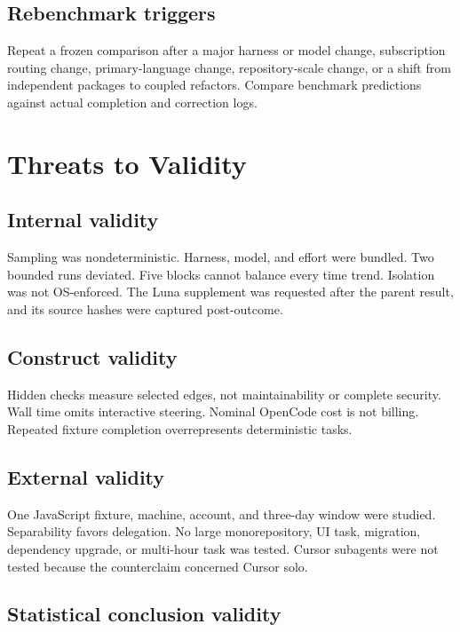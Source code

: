 \documentclass[11pt,oneside]{article}
\begin{document}
\subsection{Rebenchmark triggers}

Repeat a frozen comparison after a major harness or model change, subscription
routing change, primary-language change, repository-scale change, or a shift
from independent packages to coupled refactors. Compare benchmark predictions
against actual completion and correction logs.

\section{Threats to Validity}

\subsection{Internal validity}

Sampling was nondeterministic. Harness, model, and effort were bundled. Two
bounded runs deviated. Five blocks cannot balance every time trend. Isolation
was not OS-enforced. The Luna supplement was requested after the parent result,
and its source hashes were captured post-outcome.

\subsection{Construct validity}

Hidden checks measure selected edges, not maintainability or complete security.
Wall time omits interactive steering. Nominal OpenCode cost is not billing.
Repeated fixture completion overrepresents deterministic tasks.

\subsection{External validity}

One JavaScript fixture, machine, account, and three-day window were studied.
Separability favors delegation. No large monorepository, UI task, migration,
dependency upgrade, or multi-hour task was tested. Cursor subagents were not
tested because the counterclaim concerned Cursor solo.

\subsection{Statistical conclusion validity}
\end{document}
